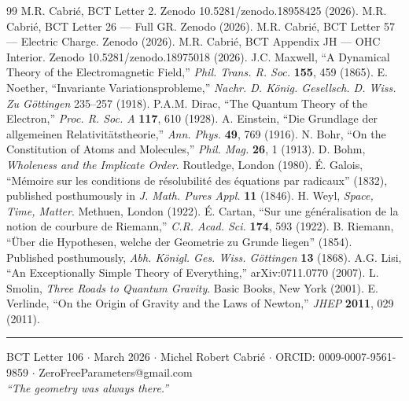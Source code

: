 \documentclass[twocolumn,10pt]{article}
\begin{document}
\begin{thebibliography}{99}
 M.R. Cabri\'{e}, BCT Letter 2. Zenodo
  10.5281/zenodo.18958425 (2026).
 M.R. Cabri\'{e}, BCT Letter 26 --- Full GR.
  Zenodo (2026).
 M.R. Cabri\'{e}, BCT Letter 57 --- Electric Charge.
  Zenodo (2026).
 M.R. Cabri\'{e}, BCT Appendix JH --- OHC Interior.
  Zenodo 10.5281/zenodo.18975018 (2026).
 J.C. Maxwell, ``A Dynamical Theory of the
  Electromagnetic Field,'' \textit{Phil. Trans. R. Soc.}
  \textbf{155}, 459 (1865).
 E. Noether, ``Invariante Variationsprobleme,''
  \textit{Nachr. D. König. Gesellsch. D. Wiss. Zu Göttingen}
  235--257 (1918).
 P.A.M. Dirac, ``The Quantum Theory of the Electron,''
  \textit{Proc. R. Soc. A} \textbf{117}, 610 (1928).
 A. Einstein, ``Die Grundlage der allgemeinen
  Relativitätstheorie,'' \textit{Ann. Phys.} \textbf{49}, 769 (1916).
 N. Bohr, ``On the Constitution of Atoms and Molecules,''
  \textit{Phil. Mag.} \textbf{26}, 1 (1913).
 D. Bohm, \textit{Wholeness and the Implicate Order}.
  Routledge, London (1980).
 \'E. Galois, ``Mémoire sur les conditions de
  résolubilité des équations par radicaux'' (1832), published
  posthumously in \textit{J. Math. Pures Appl.} \textbf{11} (1846).
 H. Weyl, \textit{Space, Time, Matter}.
  Methuen, London (1922).
 \'E. Cartan, ``Sur une généralisation de la notion
  de courbure de Riemann,'' \textit{C.R. Acad. Sci.}
  \textbf{174}, 593 (1922).
 B. Riemann, ``Über die Hypothesen, welche der
  Geometrie zu Grunde liegen'' (1854). Published posthumously,
  \textit{Abh. Königl. Ges. Wiss. Göttingen} \textbf{13} (1868).
 A.G. Lisi, ``An Exceptionally Simple Theory of
  Everything,'' arXiv:0711.0770 (2007).
 L. Smolin, \textit{Three Roads to Quantum Gravity}.
  Basic Books, New York (2001).
 E. Verlinde, ``On the Origin of Gravity and the
  Laws of Newton,'' \textit{JHEP} \textbf{2011}, 029 (2011).
\end{thebibliography}

\vspace{8pt}\noindent\rule{\linewidth}{0.4pt}
\small BCT Letter 106 $\cdot$ March 2026 $\cdot$ Michel Robert Cabri\'{e}
$\cdot$ ORCID: 0009-0007-9561-9859 $\cdot$ ZeroFreeParameters@gmail.com\\
\textit{``The geometry was always there.''}
\end{document}
